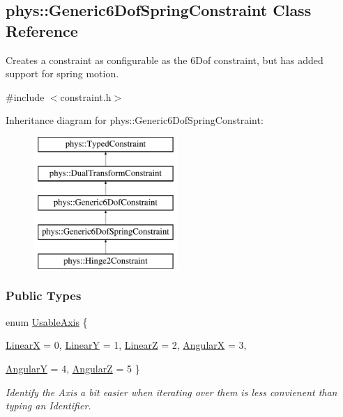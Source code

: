 \hypertarget{classphys_1_1Generic6DofSpringConstraint}{
\subsection{phys::Generic6DofSpringConstraint Class Reference}
\label{classphys_1_1Generic6DofSpringConstraint}
}


Creates a constraint as configurable as the 6Dof constraint, but has added support for spring motion.  




{\ttfamily \#include $<$constraint.h$>$}

Inheritance diagram for phys::Generic6DofSpringConstraint:\begin{figure}[H]
\begin{center}
\leavevmode
\includegraphics[height=5.000000cm]{classphys_1_1Generic6DofSpringConstraint}
\end{center}
\end{figure}
\subsubsection*{Public Types}
\begin{DoxyCompactItemize}
\item 
enum \hyperlink{classphys_1_1Generic6DofSpringConstraint_a525a9ce88c6160c44be748fe45833f60}{UsableAxis} \{ \par
\hyperlink{classphys_1_1Generic6DofSpringConstraint_a525a9ce88c6160c44be748fe45833f60afec9af16b6403edd5b6a335edbe9bffa}{LinearX} =  0, 
\hyperlink{classphys_1_1Generic6DofSpringConstraint_a525a9ce88c6160c44be748fe45833f60a243508b551645b17b8e5c42a1cf9fb72}{LinearY} =  1, 
\hyperlink{classphys_1_1Generic6DofSpringConstraint_a525a9ce88c6160c44be748fe45833f60a9d809c690118d2a37481e7aa83422492}{LinearZ} =  2, 
\hyperlink{classphys_1_1Generic6DofSpringConstraint_a525a9ce88c6160c44be748fe45833f60a52103c17e319667035ba2194f951a7d0}{AngularX} =  3, 
\par
\hyperlink{classphys_1_1Generic6DofSpringConstraint_a525a9ce88c6160c44be748fe45833f60a009951290fedb86fc9278868f7638593}{AngularY} =  4, 
\hyperlink{classphys_1_1Generic6DofSpringConstraint_a525a9ce88c6160c44be748fe45833f60a2e8e892005c4f63f43f2b42fa73c743b}{AngularZ} =  5
 \}
\begin{DoxyCompactList}\small\item\em Identify the Axis a bit easier when iterating over them is less convienent than typing an Identifier. \item\end{DoxyCompactList}\end{DoxyCompactItemize}
